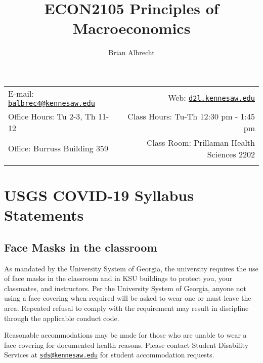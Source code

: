 \documentclass[11pt,]{article}
\title{ECON2105 Principles of Macroeconomics}
\author{Brian Albrecht}
\date{}
\begin{document}
  

		\maketitle
		
	
		\thispagestyle{firststyle}



	\noindent \begin{tabular*}{\textwidth}{ @{\extracolsep{\fill}} lr @{\extracolsep{\fill}}}


E-mail: \texttt{\href{mailto:balbrec4@kennesaw.edu}{\nolinkurl{balbrec4@kennesaw.edu}}} & Web: \href{http://d2l.kennesaw.edu}{\tt d2l.kennesaw.edu}\\
Office Hours: Tu 2-3, Th 11-12  &  Class Hours: Tu-Th 12:30 pm - 1:45 pm\\
Office: Burruss Building 359  & Class Room: Prillaman Health Sciences 2202\\
	&  \\
	\hline
	\end{tabular*}
	
\vspace{2mm}
	


\hypertarget{usgs-covid-19-syllabus-statements}{%
\section{USGS COVID-19 Syllabus Statements}\label{usgs-covid-19-syllabus-statements}}

\hypertarget{face-masks-in-the-classroom}{%
\subsection{Face Masks in the classroom}\label{face-masks-in-the-classroom}}

As mandated by the University System of Georgia, the university requires the use of face masks in the
classroom and in KSU buildings to protect you, your classmates, and instructors. Per the University System of
Georgia, anyone not using a face covering when required will be asked to wear one or must leave the area.
Repeated refusal to comply with the requirement may result in discipline through the applicable conduct code.

Reasonable accommodations may be made for those who are unable to wear a face covering for documented
health reasons. Please contact Student Disability Services at \href{mailto:sds@kennesaw.edu}{\nolinkurl{sds@kennesaw.edu}} for student accommodation
requests.
\end{document}
